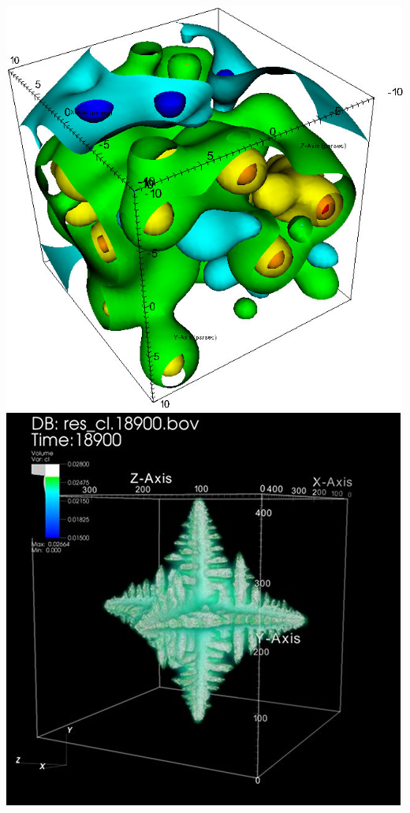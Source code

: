 \begin{frame}
\begin{columns}
\begin{column}{5cm}
	\vspace{-.75mm}
        \href{https://wci.llnl.gov/simulation/computer-codes/visit/gallery}{\includegraphics[width=.475\columnwidth]{figs/visit-exs/VisIt-contour1_S}}
        \href{https://wci.llnl.gov/simulation/computer-codes/visit/gallery}{\includegraphics[width=.475\columnwidth]{figs/visit-exs/VisIt-gallery_39}}
\end{column}
\end{columns}
\end{frame}


